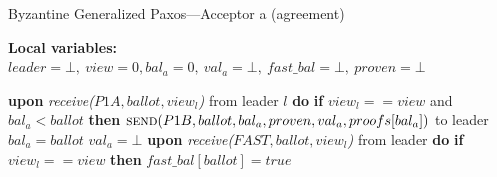 \documentclass[algorithms,article,accept,moreauthors,pdftex,10pt,a4paper]{Definitions/mdpi}
\begin{document}
\begin{algorithm}[H] 
\caption{Byzantine Generalized Paxos---Acceptor a (agreement)}
\label{BFT-Acc}
\textbf{Local variables:} $leader = \bot,\ view = 0, bal_a = 0,\ val_a = \bot,\ fast\_bal = \bot,\ proven = \bot$
\begin{algorithmic}[1]
\State \textbf{upon} \textit{receive($P1A, ballot, view_l$)} from leader $l$ \textbf{do}
\State \hspace{\algorithmicindent} \textbf{if} $view_l == view$ and $bal_a < ballot$ \textbf{then}
\State \hspace{\algorithmicindent}\hspace{\algorithmicindent} $\Call{send}{P1B, ballot,bal_a,proven, val_a, proofs[bal_a]}$ to leader
\State \hspace{\algorithmicindent}\hspace{\algorithmicindent} $bal_a = ballot$
\State \hspace{\algorithmicindent}\hspace{\algorithmicindent} $val_a = \bot$ 
\State
\State \textbf{upon} \textit{receive($FAST,ballot,view_l$)} from leader \textbf{do}
\State \hspace{\algorithmicindent} \textbf{if} $view_l == view$ \textbf{then}
\State \hspace{\algorithmicindent}\hspace{\algorithmicindent} $fast\_bal[ballot] = true$


\end{algorithmic}
\end{algorithm}
\end{document}
